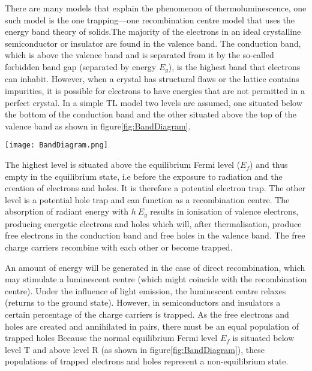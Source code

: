 \documentclass[../introduction.tex]{subfiles}
\begin{document}
        There are many models that explain the phenomenon of thermoluminescence\cite{b5}, one such model is the one 
        trapping—one recombination centre model\cite{b2} that uses the energy band theory of solids.The majority of the 
        electrons in an ideal crystalline semiconductor or insulator are found in the valence band. The conduction band, 
        which is above the valence band and is separated from it by the so-called forbidden band gap (separated by energy $E_g$), 
        is the highest band that electrons can inhabit. However, when a crystal has structural flaws or the lattice 
        contains impurities, it is possible for electrons to have energies that are not permitted in a perfect crystal.
        In a simple TL model two levels are assumed, one situated below the bottom of the conduction band and the other 
        situated above the top of the valence band as shown in figure\ref{fig:BandDiagram}. 
        \begin{Figure}
            \centering
            \texttt{[image: BandDiagram.png]}
            \label{fig:BandDiagram}
        \end{Figure}
        
        The highest level is situated above the equilibrium Fermi level ($E_f$) and thus empty in the equilibrium state, 
        i.e before the exposure to radiation and the creation of electrons and holes. It is therefore a potential 
        electron trap. The other level is a potential hole trap and can function as a recombination centre. 
        The absorption of radiant energy with $h \> E_g$ results in ionisation of valence electrons, producing 
        energetic electrons and holes which will, after thermalisation, produce free electrons in the conduction 
        band and free holes in the valence band. The free charge carriers recombine with each other or become trapped.

        An amount of energy will be generated in the case of direct recombination, which may stimulate a luminescent 
        centre (which might coincide with the recombination centre). Under the influence of light emission, the 
        luminescent centre relaxes (returns to the ground state).  However, in semiconductors and insulators a
        certain percentage of the charge carriers is trapped. As the free electrons and holes are created and annihilated
        in pairs, there must be an equal population of trapped holes Because the normal equilibrium Fermi level $E_f$ is
        situated below level T and above level R (as shown in figure\ref{fig:BandDiagram}), these populations of
        trapped electrons and holes represent a non-equilibrium state.
\end{document}
